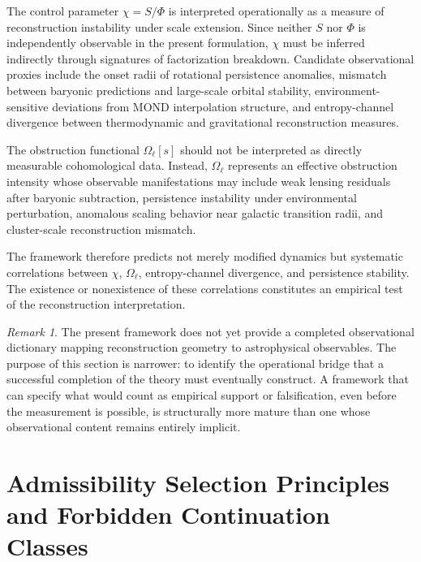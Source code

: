 \documentclass[11pt, a4paper]{article}
\theoremstyle{plain}
\theoremstyle{definition}
\theoremstyle{remark}
\newtheorem{remark}[theorem]{Remark}
\begin{document}
The control parameter $\chi = S/\Phi$ is interpreted operationally as a measure of
reconstruction instability under scale extension. Since neither $S$ nor $\Phi$ is
independently observable in the present formulation, $\chi$ must be inferred
indirectly through signatures of factorization breakdown. Candidate observational
proxies include the onset radii of rotational persistence anomalies, mismatch between
baryonic predictions and large-scale orbital stability, environment-sensitive
deviations from MOND interpolation structure, and entropy-channel divergence between
thermodynamic and gravitational reconstruction measures.

The obstruction functional $\Omega_\ell[s]$ should not be interpreted as directly
measurable cohomological data. Instead, $\Omega_\ell$ represents an effective
obstruction intensity whose observable manifestations may include weak lensing
residuals after baryonic subtraction, persistence instability under environmental
perturbation, anomalous scaling behavior near galactic transition radii, and
cluster-scale reconstruction mismatch.

The framework therefore predicts not merely modified dynamics but systematic
correlations between $\chi$, $\Omega_\ell$, entropy-channel divergence, and
persistence stability. The existence or nonexistence of these correlations constitutes
an empirical test of the reconstruction interpretation.

\begin{remark}
The present framework does not yet provide a completed observational dictionary
mapping reconstruction geometry to astrophysical observables. The purpose of this
section is narrower: to identify the operational bridge that a successful completion
of the theory must eventually construct. A framework that can specify what would count
as empirical support or falsification, even before the measurement is possible, is
structurally more mature than one whose observational content remains entirely
implicit.
\end{remark}

\section{Admissibility Selection Principles and Forbidden Continuation Classes}
\label{sec:forbidden}
\end{document}
